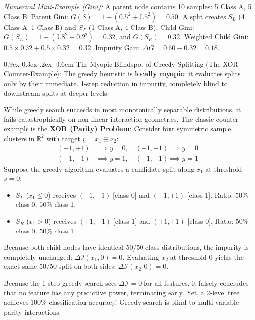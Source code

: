 \documentclass[11pt,a4paper]{article}
\makeatletter
\renewcommand\paragraph{\@startsection{paragraph}{4}{\z@}%
                                     {0.9ex \@plus0.3ex \@minus.2ex}%
                                     {-0.6em}%
                                     {\normalfont\normalsize\bfseries}}
\newcommand{\R}{\mathbb{R}}
\makeatother
\begin{document}
\emph{Numerical Mini-Example (Gini):} A parent node contains 10 samples: 5 Class A, 5 Class B. Parent Gini: $G(S) = 1 - (0.5^2 + 0.5^2) = 0.50$. A split creates $S_L$ (4 Class A, 1 Class B) and $S_R$ (1 Class A, 4 Class B).
Child Gini: $G(S_L) = 1 - (0.8^2 + 0.2^2) = 0.32$, and $G(S_R) = 0.32$.
Weighted Child Gini: $0.5 \times 0.32 + 0.5 \times 0.32 = 0.32$.
Impurity Gain: $\Delta G = 0.50 - 0.32 = 0.18$.

\paragraph{The Myopic Blindspot of Greedy Splitting (The XOR Counter-Example):}
The greedy heuristic is \textbf{locally myopic}: it evaluates splits only by their immediate, 1-step reduction in impurity, completely blind to downstream splits at deeper levels. 

While greedy search succeeds in most monotonically separable distributions, it fails catastrophically on non-linear interaction geometries. The classic counter-example is the \textbf{XOR (Parity) Problem}:
Consider four symmetric sample clusters in $\R^2$ with target $y = x_1 \oplus x_2$:
\begin{align*}
    (+1, +1) &\implies y = 0, \quad (-1, -1) \implies y = 0 \\
    (+1, -1) &\implies y = 1, \quad (-1, +1) \implies y = 1
\end{align*}
Suppose the greedy algorithm evaluates a candidate split along $x_1$ at threshold $s = 0$:
\begin{itemize}
    \item $S_L$ ($x_1 \le 0$) receives $(-1, -1)$ [class 0] and $(-1, +1)$ [class 1]. Ratio: $50\%$ class 0, $50\%$ class 1.
    \item $S_R$ ($x_1 > 0$) receives $(+1, -1)$ [class 1] and $(+1, +1)$ [class 0]. Ratio: $50\%$ class 0, $50\%$ class 1.
\end{itemize}
Because both child nodes have identical 50/50 class distributions, the impurity is completely unchanged: $\Delta \mathcal{I}(x_1, 0) = 0$. Evaluating $x_2$ at threshold 0 yields the exact same 50/50 split on both sides: $\Delta \mathcal{I}(x_2, 0) = 0$.

Because the 1-step greedy search sees $\Delta \mathcal{I} = 0$ for all features, it falsely concludes that no feature has any predictive power, terminating early. Yet, a 2-level tree achieves $100\%$ classification accuracy! Greedy search is blind to multi-variable parity interactions.
\end{document}
